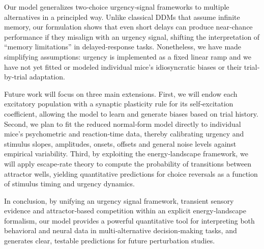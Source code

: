 \documentclass[ESP]{fancynotes}
\begin{document}
Our model generalizes two‐choice urgency‐signal frameworks \cite{inagaki2019,wong2006} to multiple alternatives in a principled way. Unlike classical DDMs that assume infinite memory, our formulation shows that even short delays can produce near‐chance performance if they misalign with an urgency signal, shifting the interpretation of “memory limitations” in delayed‐response tasks. Nonetheless, we have made simplifying assumptions: urgency is implemented as a fixed linear ramp and we have not yet fitted or modeled individual mice’s idiosyncratic biases or their trial‐by‐trial adaptation.

Future work will focus on three main extensions. First, we will endow each excitatory population with a synaptic plasticity rule for its self‐excitation coefficient, allowing the model to learn and generate biases based on trial history. Second, we plan to fit the reduced normal‐form model directly to individual mice’s psychometric and reaction‐time data, thereby calibrating urgency and stimulus slopes, amplitudes, onsets, offsets and general noise levels against empirical variability. Third, by exploiting the energy‐landscape framework, we will apply escape‐rate theory to compute the probability of transitions between attractor wells, yielding quantitative predictions for choice reversals as a function of stimulus timing and urgency dynamics.

In conclusion, by unifying an urgency signal framework, transient sensory evidence and attractor‐based competition within an explicit energy‐landscape formalism, our model provides a powerful quantitative tool for interpreting both behavioral and neural data in multi‐alternative decision‐making tasks, and generates clear, testable predictions for future perturbation studies.
\end{document}
